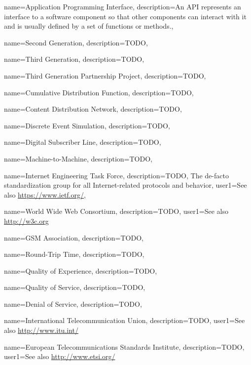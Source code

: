 

{
  name=Application Programming Interface,
  description={An API represents an interface to a software component so that other components can interact with it and is usually defined by a set of functions or methods.},
}

{
  name=Second Generation,
  description={TODO},
}

{
  name=Third Generation,
  description={TODO},
}

{
  name=Third Generation Partnership Project,
  description={TODO},
}

{
  name=Cumulative Distribution Function,
  description={TODO},
}

{
  name=Content Distribution Network,
  description={TODO},
}

{
  name=Discrete Event Simulation,
  description={TODO},
}

{
  name=Digital Subscriber Line,
  description={TODO},
}

{
  name=Machine-to-Machine,
  description={TODO},
}

{
  name=Internet Engineering Task Force,
  description={TODO, The de-facto standardization group for all Internet-related protocols and behavior},
  user1={See also \url{https://www.ietf.org/}},
}


{
  name=World Wide Web Consortium,
  description={TODO},
  user1={See also \url{http://w3c.org}}
}

{
  name=\acrshort{GSM} Association,
  description={TODO},
}

{
  name=Round-Trip Time,
  description={TODO},
}

{
  name=Quality of Experience,
  description={TODO},
}

{
  name=Quality of Service,
  description={TODO},
}

{
  name=Denial of Service,
  description={TODO},
}

{
  name=International Telecommunication Union,
  description={TODO},
  user1={See also \url{http://www.itu.int/}}
}

{
  name=European Telecommunications Standards Institute,
  description={TODO},
  user1={See also \url{http://www.etsi.org/}}
}
